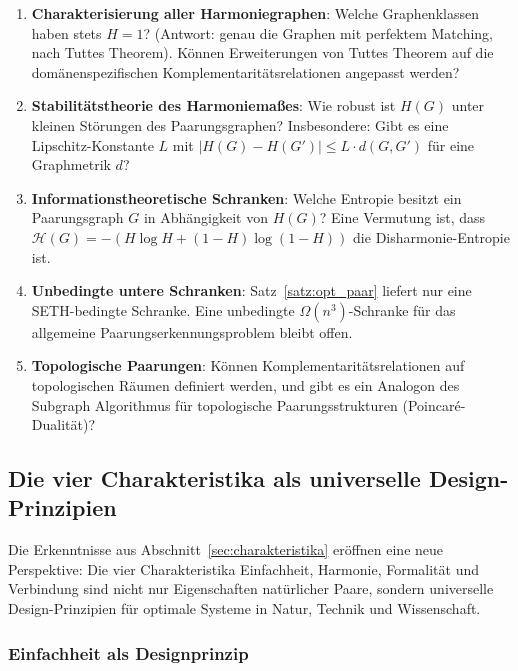 ﻿\documentclass[a4paper,12pt]{article}
\theoremstyle{definition}
\begin{document}
\begin{enumerate}
	\item \textbf{Charakterisierung aller Harmoniegraphen}: Welche Graphenklassen
	haben stets $H = 1$? (Antwort: genau die Graphen mit perfektem Matching, nach
	Tuttes Theorem). Können Erweiterungen von Tuttes Theorem auf die domänenspezifischen
	Komplementaritätsrelationen angepasst werden?
	
	\item \textbf{Stabilitätstheorie des Harmoniemaßes}: Wie robust ist $H(G)$ unter
	kleinen Störungen des Paarungsgraphen? Insbesondere: Gibt es eine Lipschitz-Konstante
	$L$ mit $|H(G) - H(G')| \leq L \cdot d(G, G')$ für eine Graphmetrik $d$?
	
	\item \textbf{Informationstheoretische Schranken}: Welche Entropie besitzt ein
	Paarungsgraph $G$ in Abhängigkeit von $H(G)$? Eine Vermutung ist, dass
	$\mathcal{H}(G) = -(H\log H + (1-H)\log(1-H))$ die Disharmonie-Entropie ist.
	
	\item \textbf{Unbedingte untere Schranken}: Satz~\ref{satz:opt_paar} liefert nur
	eine SETH-bedingte Schranke. Eine unbedingte $\Omega(n^3)$-Schranke für das
	allgemeine Paarungserkennungsproblem bleibt offen.
	
	\item \textbf{Topologische Paarungen}: Können Komplementaritätsrelationen auf
	topologischen Räumen definiert werden, und gibt es ein Analogon des
	Subgraph Algorithmus für topologische Paarungsstrukturen (Poincaré-Dualität)?
\end{enumerate}


\subsection{Die vier Charakteristika als universelle Design-Prinzipien}
\label{subsec:design}

Die Erkenntnisse aus Abschnitt~\ref{sec:charakteristika} eröffnen eine neue Perspektive:
Die vier Charakteristika Einfachheit, Harmonie, Formalität und Verbindung sind nicht nur
Eigenschaften natürlicher Paare, sondern universelle Design-Prinzipien für optimale Systeme
in Natur, Technik und Wissenschaft.

\subsubsection*{Einfachheit als Designprinzip}
\end{document}
